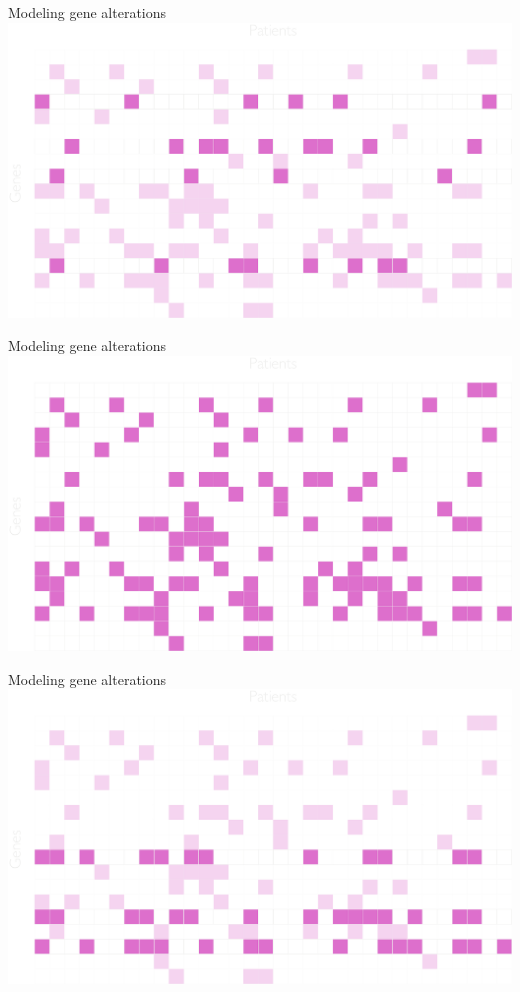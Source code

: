 \documentclass[mathserif]{beamer}
\begin{document}
\begin{frame}{Modeling gene alterations}
\includegraphics[width=\textwidth]{figures/grid_genes_muex.pdf}
\end{frame}


\begin{frame}{Modeling gene alterations}
\centering
\includegraphics[width=\textwidth]{figures/grid_genes.pdf}
\end{frame}


\begin{frame}{Modeling gene alterations}
\includegraphics[width=\textwidth]{figures/grid_genes_cooc.pdf}
\end{frame}
\end{document}
